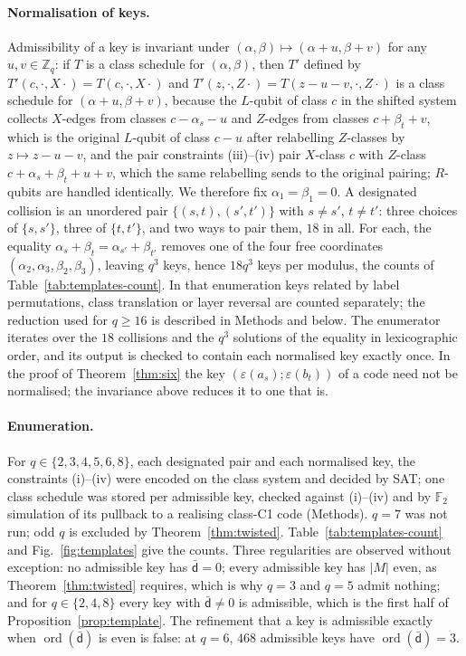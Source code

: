 \documentclass[reprint,twocolumn,superscriptaddress,nofootinbib]{revtex4-2}
\theoremstyle{plain}
\newcommand{\Zq}{\mathbb{Z}_q}
\newcommand{\F}{\mathbb{F}_2}
\newcommand{\colbar}{\bar{\mathsf{d}}} %
\begin{document}
\paragraph*{Normalisation of keys.}
Admissibility of a key is invariant under $(\alpha,\beta)\mapsto
(\alpha+u,\beta+v)$ for any $u,v\in\Zq$: if $T$ is a class schedule for
$(\alpha,\beta)$, then $T'$ defined by $T'(c,\cdot,X\cdot)=T(c,\cdot,X\cdot)$
and $T'(z,\cdot,Z\cdot)=T(z-u-v,\cdot,Z\cdot)$ is a class schedule for
$(\alpha+u,\beta+v)$, because the $L$-qubit of class $c$ in the shifted
system collects $X$-edges from classes $c-\alpha_s-u$ and $Z$-edges from
classes $c+\beta_t+v$, which is the original $L$-qubit of class $c-u$
after relabelling $Z$-classes by $z\mapsto z-u-v$, and the pair
constraints (iii)--(iv) pair $X$-class $c$ with $Z$-class
$c+\alpha_s+\beta_t+u+v$, which the same relabelling sends to the original
pairing; $R$-qubits are handled identically. We therefore fix
$\alpha_1=\beta_1=0$. A designated collision is an unordered pair
$\{(s,t),(s',t')\}$ with $s\neq s'$, $t\neq t'$: three choices of
$\{s,s'\}$, three of $\{t,t'\}$, and two ways to pair them, $18$ in all.
For each, the equality $\alpha_s+\beta_t=\alpha_{s'}+\beta_{t'}$ removes
one of the four free coordinates $(\alpha_2,\alpha_3,\beta_2,\beta_3)$,
leaving $q^3$ keys, hence $18q^3$ keys per modulus, the counts of
Table~\ref{tab:templates-count}. In that enumeration keys related by
label permutations, class translation or layer reversal are counted
separately; the reduction used for $q\ge16$ is described in Methods and
below. The enumerator iterates over the $18$
collisions and the $q^3$ solutions of the equality in lexicographic
order, and its output is checked to contain each normalised key exactly
once. In the proof of Theorem~\ref{thm:six} the key
$(\varepsilon(a_s);\varepsilon(b_t))$ of a code need not be normalised;
the invariance above reduces it to one that is.

\paragraph*{Enumeration.}
For $q\in\{2,3,4,5,6,8\}$, each designated pair and each normalised key,
the constraints (i)--(iv) were encoded on the class system and decided by
SAT; one class schedule was stored per admissible key, checked against
(i)--(iv) and by $\F$ simulation of its pullback to a realising class-C1
code (Methods). $q=7$ was not run; odd $q$ is excluded by
Theorem~\ref{thm:twisted}. Table~\ref{tab:templates-count} and
Fig.~\ref{fig:templates} give the counts. Three regularities are observed
without exception: no admissible key has $\colbar=0$; every admissible key
has $|M|$ even, as Theorem~\ref{thm:twisted} requires, which is why $q=3$
and $q=5$ admit nothing; and for $q\in\{2,4,8\}$ every key with
$\colbar\neq0$ is admissible, which is the first half of
Proposition~\ref{prop:template}. The refinement that a key is admissible
exactly when $\operatorname{ord}(\colbar)$ is even is false: at $q=6$,
$468$ admissible keys have $\operatorname{ord}(\colbar)=3$.
\end{document}
